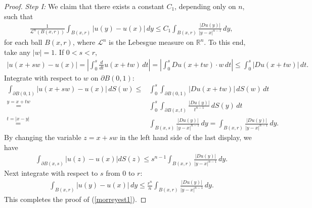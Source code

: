 \documentclass{article}
\numberwithin{equation}{section}
\newcommand{\bbR}{\mathbb{R}}
\theoremstyle{plain}
\theoremstyle{definition}
\begin{document}
\begin{proof}
\textit{Step I:} We claim that there exists a constant $C_1$, depending only on $n$, such that
\begin{align}
	\frac{1}{\mathcal{L}^n(B(x,r))}\int_{B(x,r)}
	\vert u(y)-u(x)\vert\,dy\leq C_1\int_{B(x,r)} \frac{\vert Du(y)\vert}{\vert y-x\vert^{n-1}}\,dy,\label{morreyest1}
\end{align}
for each ball $B(x,r)$, where $\mathcal{L}^n$ is the Lebesgue measure on $\bbR^n$. To this end, take any $\vert w\vert=1$. If $0<s<r$,
\begin{align*}
	\vert u(x+sw)-u(x)\vert=\left\vert\int_0^s\frac{d}{dt}u(x+tw)\,dt\right\vert=\left\vert\int_0^s Du(x+tw)\cdot w\,dt\right\vert\leq\int_0^s\vert Du(x+tw)\vert\,dt.
\end{align*}
Integrate with respect to $w$ on $\partial B(0,1)$:
\begin{align*}
\int_{\partial B(0,1)}\vert u(x+sw)-u(x)\vert\,dS(w)\leq&\int_0^s\int_{\partial B(0,1)}\vert Du(x+tw)\vert\,dS(w)\,dt\\
\overset{y=x+tw}{=}&\int_0^s\int_{\partial B(x,t)}\frac{\vert Du(y)\vert}{t^{n-1}}\,dS(y)\,dt\\
\overset{t=\vert x-y\vert}{=}&\int_{B(x,s)}\frac{\vert Du(y)\vert}{\vert y-x\vert^{n-1}}\,dy=\int_{B(x,r)}\frac{\vert Du(y)\vert}{\vert y-x\vert^{n-1}}\,dy.
\end{align*}
By changing the variable $z=x+sw$ in the left hand side of the last display, we have
\begin{align*}
	\int_{\partial B(x,s)}\vert u(z)-u(x)\vert dS(z)\leq s^{n-1}\int_{B(x,r)}\frac{\vert Du(y)\vert}{\vert y-x\vert^{n-1}}\,dy.
\end{align*}
Next integrate with respect to $s$ from $0$ to $r$:
\begin{align*}
	\int_{B(x,r)}\vert u(y)-u(x)\vert\,dy\leq\frac{r^n}{n}\int_{B(x,r)}\frac{\vert Du(y)\vert}{\vert y-x\vert^{n-1}}\,dy.
\end{align*}
This completes the proof of (\ref{morreyest1}).\vspace{0.1cm}


\end{proof}
\end{document}

